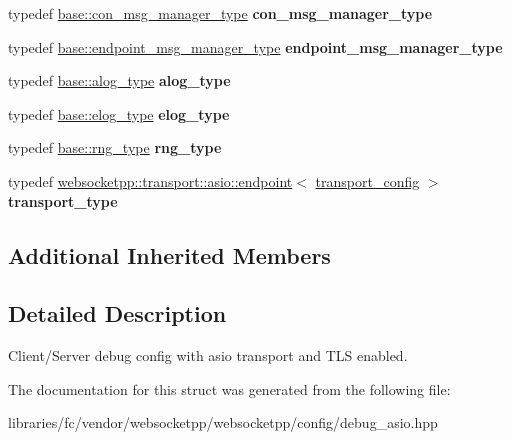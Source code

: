 \begin{DoxyCompactItemize}
typedef \mbox{\hyperlink{classwebsocketpp_1_1message__buffer_1_1alloc_1_1con__msg__manager}{base\+::con\+\_\+msg\+\_\+manager\+\_\+type}} {\bfseries con\+\_\+msg\+\_\+manager\+\_\+type}
\item 
\mbox{\label{structwebsocketpp_1_1config_1_1debug__asio__tls_a2457bf3a910a01c162fffe78bf120cc7}} 
typedef \mbox{\hyperlink{classwebsocketpp_1_1message__buffer_1_1alloc_1_1endpoint__msg__manager}{base\+::endpoint\+\_\+msg\+\_\+manager\+\_\+type}} {\bfseries endpoint\+\_\+msg\+\_\+manager\+\_\+type}
\item 
\mbox{\label{structwebsocketpp_1_1config_1_1debug__asio__tls_a317d8aab94f5283aa99873ce93eac381}} 
typedef \mbox{\hyperlink{classwebsocketpp_1_1log_1_1basic}{base\+::alog\+\_\+type}} {\bfseries alog\+\_\+type}
\item 
\mbox{\label{structwebsocketpp_1_1config_1_1debug__asio__tls_a1f2ef75a6538ba22a7fbfa0749d3ad7e}} 
typedef \mbox{\hyperlink{structwebsocketpp_1_1config_1_1debug__core_acfa1ded7f80d6a7276b0ec3fd0859fc3}{base\+::elog\+\_\+type}} {\bfseries elog\+\_\+type}
\item 
\mbox{\label{structwebsocketpp_1_1config_1_1debug__asio__tls_a31ca397251fac66cfe514e48802e3182}} 
typedef \mbox{\hyperlink{structwebsocketpp_1_1config_1_1debug__core_ae59c72992beaef76957c8bfe407394e8}{base\+::rng\+\_\+type}} {\bfseries rng\+\_\+type}
\item 
\mbox{\label{structwebsocketpp_1_1config_1_1debug__asio__tls_a9c9369aef0a393f0293d8a4a6192aaff}} 
typedef \mbox{\hyperlink{classwebsocketpp_1_1transport_1_1asio_1_1endpoint}{websocketpp\+::transport\+::asio\+::endpoint}}$<$ \mbox{\hyperlink{structwebsocketpp_1_1config_1_1debug__asio__tls_1_1transport__config}{transport\+\_\+config}} $>$ {\bfseries transport\+\_\+type}
\end{DoxyCompactItemize}
\subsection*{Additional Inherited Members}


\subsection{Detailed Description}
Client/\+Server debug config with asio transport and T\+LS enabled. 

The documentation for this struct was generated from the following file\+:\begin{DoxyCompactItemize}
\item 
libraries/fc/vendor/websocketpp/websocketpp/config/debug\+\_\+asio.\+hpp\end{DoxyCompactItemize}
